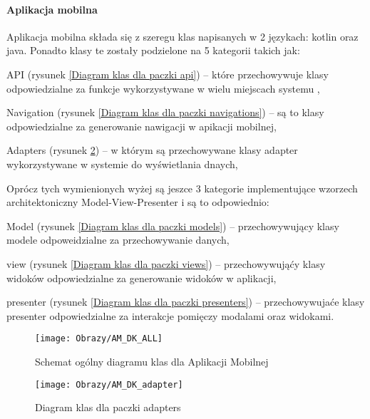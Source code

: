 		\paragraph{Aplikacja mobilna}
		Aplikacja mobilna składa się z szeregu klas napisanych w 2 językach: kotlin oraz java. Ponadto klasy te 
		zostały podzielone na 5 kategorii takich jak:
		\begin{itemize*}
			\item API 
			(rysunek \ref{Diagram klas dla paczki api}) 
			--  które przechowywuje klasy odpowiedzialne za funkcje wykorzystywane w wielu miejscach systemu ,
			\item Navigation 
			(rysunek \ref{Diagram klas dla paczki navigations}) 
			-- są to klasy odpowiedzialne za generowanie nawigacji w apikacji mobilnej,
			\item Adapters
			(rysunek \ref{Diagram klas dla paczki adapters}) 
			 -- w którym są przechowywane klasy adapter wykorzystywane w systemie do wyświetlania dnaych,
		\end{itemize*}
		Oprócz tych wymienionych wyżej są jeszce 3 kategorie implementujące wzorzech architektoniczny Model-View-Presenter i są to odpowiednio:
			\begin{itemize*}
				\item Model
				(rysunek \ref{Diagram klas dla paczki models}) 
				 -- przechowywujący klasy modele odpoweidzialne za przechowywanie danych,   
				\item view 
				(rysunek \ref{Diagram klas dla paczki views}) 
				-- przechowywująćy klasy widoków odpowiedzialne za generowanie widoków w aplikacji, 
				\item presenter
				(rysunek \ref{Diagram klas dla paczki presenters}) 
				 -- przechowywujaće klasy presenter odpowiedzialne za interakcje pomięczy modalami oraz widokami.
			\end{itemize*}
		
	
		\begin{figure}[ht!]
			\centering
			\texttt{[image: Obrazy/AM\_DK\_ALL]}
			\caption{Schemat ogólny diagramu klas dla Aplikacji Mobilnej}
			\label{Schemat ogólny diagramu klas dla Aplikacji mobilnej}
		\end{figure}
	

		\begin{figure}[ht!]
		\centering
		\texttt{[image: Obrazy/AM\_DK\_adapter]}
		\caption{Diagram klas dla paczki adapters}
		\label{Diagram klas dla paczki adapters}
	\end{figure}


